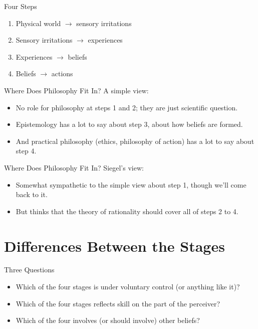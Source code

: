 \documentclass[
  17pt,
  letterpaper,
  ignorenonframetext,
  aspectratio=169,
  xcolor={dvipsnames}]{beamer}
\providecommand{\tightlist}{%
  \setlength{\itemsep}{0pt}\setlength{\parskip}{0pt}}\usepackage{longtable,booktabs,array}
\begin{document}
\begin{frame}{Four Steps}
\protect\hypertarget{four-steps-1}{}
\begin{enumerate}[<+->]
\tightlist
\item
  Physical world \(\rightarrow\) sensory irritations
\item
  Sensory irritations \(\rightarrow\) experiences
\item
  Experiences \(\rightarrow\) beliefs
\item
  Beliefs \(\rightarrow\) actions
\end{enumerate}
\end{frame}

\begin{frame}{Where Does Philosophy Fit In?}
\protect\hypertarget{where-does-philosophy-fit-in}{}
A simple view:

\begin{itemize}[<+->]
\tightlist
\item
  No role for philosophy at steps 1 and 2; they are just scientific
  question.
\item
  Epistemology has a lot to say about step 3, about how beliefs are
  formed.
\item
  And practical philosophy (ethics, philosophy of action) has a lot to
  say about step 4.
\end{itemize}
\end{frame}

\begin{frame}{Where Does Philosophy Fit In?}
\protect\hypertarget{where-does-philosophy-fit-in-1}{}
Siegel's view:

\begin{itemize}[<+->]
\tightlist
\item
  Somewhat sympathetic to the simple view about step 1, though we'll
  come back to it.
\item
  But thinks that the theory of rationality should cover all of steps 2
  to 4.
\end{itemize}
\end{frame}

\hypertarget{differences-between-the-stages}{%
\section{Differences Between the
Stages}\label{differences-between-the-stages}}

\begin{frame}{Three Questions}
\protect\hypertarget{three-questions}{}
\begin{itemize}[<+->]
\tightlist
\item
  Which of the four stages is under voluntary control (or anything like
  it)?
\item
  Which of the four stages reflects skill on the part of the perceiver?
\item
  Which of the four involves (or should involve) other beliefs?
\end{itemize}
\end{frame}
\end{document}
